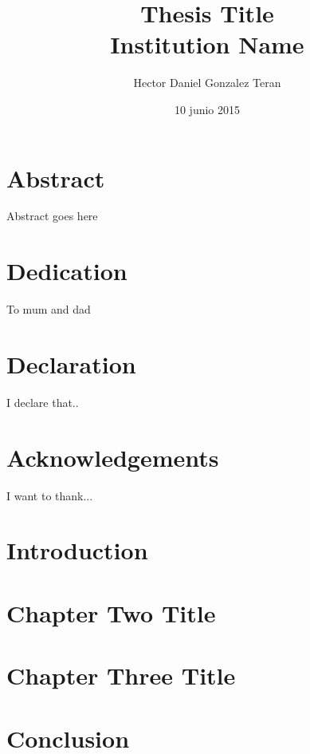 \documentclass[a4paper,10pt]{report}
\title{
	{Thesis Title}\\
	{\large Institution Name}\\
}
\author{Hector Daniel Gonzalez Teran}
\date{10 junio 2015}
\begin{document}
\maketitle


\chapter*{Abstract}
Abstract goes here

\chapter*{Dedication}
To mum and dad

\chapter*{Declaration}
I declare that..

\chapter*{Acknowledgements}
I want to thank...

\tableofcontents

\chapter{Introduction}


\chapter{Chapter Two Title}


\chapter{Chapter Three Title}


\chapter{Conclusion}

\end{document}
